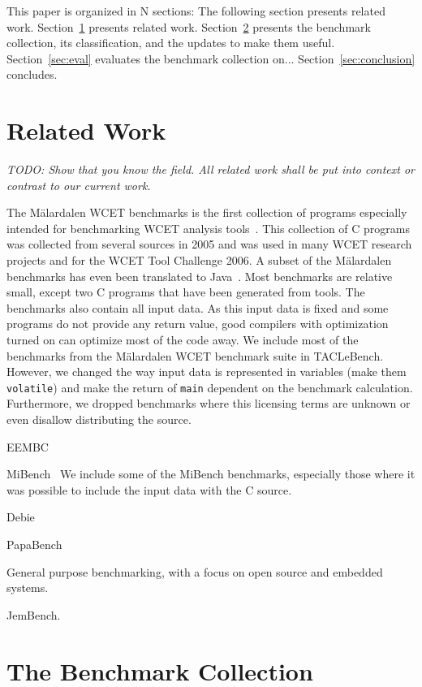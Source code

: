 \documentclass[a4paper,UKenglish]{oasics}
\newcommand{\todo}[1]{{\emph{TODO: #1}}}
\newcommand{\code}[1]{{\small{\texttt{#1}}}}
\begin{document}
This paper is organized in N sections: The following section presents related work.
Section~\ref{sec:related} presents related work.
Section~\ref{sec:collect} presents the benchmark collection, its classification, and the updates
to make them useful.
Section~\ref{sec:eval} evaluates the benchmark collection on...
Section~\ref{sec:conclusion} concludes.

\section{Related Work}
\label{sec:related}

\todo{Show that you know the field. All related work shall be put
into context or contrast to our current work.}

The M{\"a}lardalen WCET benchmarks is the first collection of programs especially
intended for benchmarking WCET analysis tools~\cite{wcet:bench:2012}.
This collection of C programs was collected from several sources in 2005 and
was used in many WCET research projects and for the WCET Tool Challenge 2006.
A subset of the M{\"a}lardalen benchmarks has even been translated to
Java~\cite{jop:volta:rtas2008}. Most benchmarks are relative small, except
two C programs that have been generated from tools. The benchmarks also
contain all input data. As this input data is fixed and some programs do not provide
any return value, good compilers with optimization turned on can optimize
most of the code away. We include most of the benchmarks from the
 M{\"a}lardalen WCET benchmark suite in TACLeBench. However, we changed
 the way input data is represented in variables (make them \code{volatile})
 and make the return of \code{main} dependent on the benchmark calculation.
 Furthermore, we dropped benchmarks where this licensing terms are unknown
 or even disallow distributing the source.

EEMBC

MiBench~\cite{MiBench} We include some of the MiBench benchmarks, especially
those where it was possible to include the input data with the C source.

Debie~\cite{debie}

PapaBench~\cite{papabench}

General purpose benchmarking, with a focus on open source and embedded systems.

JemBench.

\section{The Benchmark Collection}
\label{sec:collect}
\end{document}
